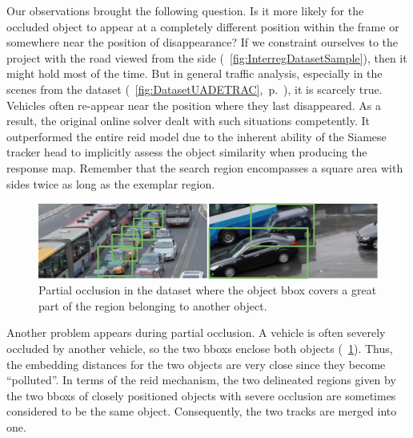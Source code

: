 Our observations brought the following question. Is it more likely for the occluded object to appear at a completely different position within the frame or somewhere near the position of disappearance? If we constraint ourselves to the \interreg{} project with the road viewed from the side (\figtext{}~\ref{fig:InterregDatasetSample}), then it might hold most of the time. But in general traffic analysis, especially in the scenes from the \uadetrac{} dataset (\figtext{}~\ref{fig:DatasetUADETRAC},~p.~\pageref{fig:DatasetUADETRAC}), it is scarcely true. Vehicles often re-appear near the position where they last disappeared. As a result, the original online solver dealt with such situations competently. It outperformed the entire \gls{reid} model due to the inherent ability of the Siamese tracker head to implicitly assess the object similarity when producing the response map. Remember that the search region encompasses a square area with sides twice as long as the exemplar region.

\begin{figure}[!t]
    \centering
    \includegraphics[width=\linewidth]{figures/siamese_tracking/uadetrac_partial_occlusion_multiple_cars.pdf}
    \caption[Partial occlusion in \uadetrac{} dataset]{Partial occlusion in the \uadetrac{} dataset where the object \gls{bbox} covers a great part of the region belonging to another object.}
    \label{fig:UADETRACPartialOcclusionMultiple}
\end{figure}

Another problem appears during partial occlusion. A vehicle is often severely occluded by another vehicle, so the two \glspl{bbox} enclose both objects (\figtext{}~\ref{fig:UADETRACPartialOcclusionMultiple}). Thus, the embedding distances for the two objects are very close since they become ``polluted''. In terms of the \gls{reid} mechanism, the two delineated regions given by the two \glspl{bbox} of closely positioned objects with severe occlusion are sometimes considered to be the same object. Consequently, the two tracks are merged into one.


